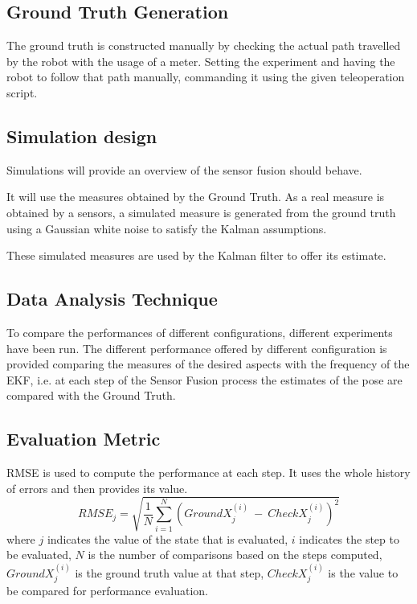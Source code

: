 \subsection{Ground Truth Generation}
\label{sec:gt}

\noindent The ground truth is constructed manually by checking the actual path travelled by the robot with the usage of a meter. Setting the experiment and having the robot to follow that path manually, commanding it using the given teleoperation script.


\subsection{Simulation design}
\label{sec:simDesign}

\noindent Simulations will provide an overview of the sensor fusion should behave.

It will use the measures obtained by the Ground Truth.
As a real measure is obtained by a sensors, a simulated measure is generated from the ground truth using a Gaussian white noise to satisfy the Kalman assumptions.

These simulated measures are used by the Kalman filter to offer its estimate.



\subsection{Data Analysis Technique}

\noindent To compare the performances of different configurations, different experiments have been run.
The different performance offered by different configuration is provided comparing the measures of the desired aspects with the frequency of the \gls{EKF}, i.e. at each step of the Sensor Fusion process the estimates of the pose are compared with the Ground Truth.



\subsection{Evaluation Metric}

\noindent \gls{RMSE} is used to compute the performance at each step.
It uses the whole history of errors and then provides its value.
\begin{equation}
    RMSE_j = \sqrt{ \frac{1}{N}\sum_{i=1}^{N} (GroundX_j^{(i)}~-~CheckX_j^{(i)})^2}
\end{equation}
where $j$ indicates the value of the state that is evaluated, $i$ indicates the step to be evaluated, $N$ is the number of comparisons based on the steps computed, $GroundX_j^{(i)}$ is the ground truth value at that step, $CheckX_j^{(i)}$ is the value to be compared for performance evaluation.

